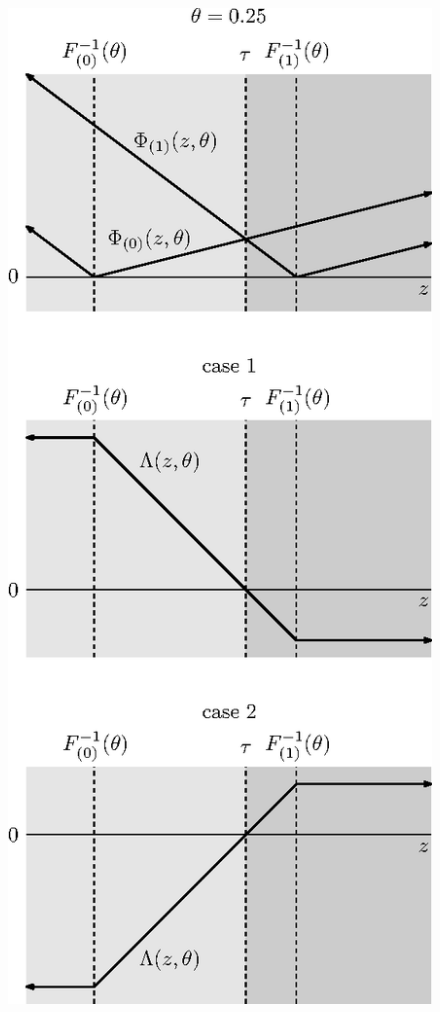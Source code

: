 \begin{figure}[p]
  \begin{minipage}[t]{0.49\linewidth}
    \centering
    \includegraphics{phi-lambda-0-25}
  \end{minipage}
  \begin{minipage}[t]{0.49\linewidth}

\end{minipage}
\end{figure}
